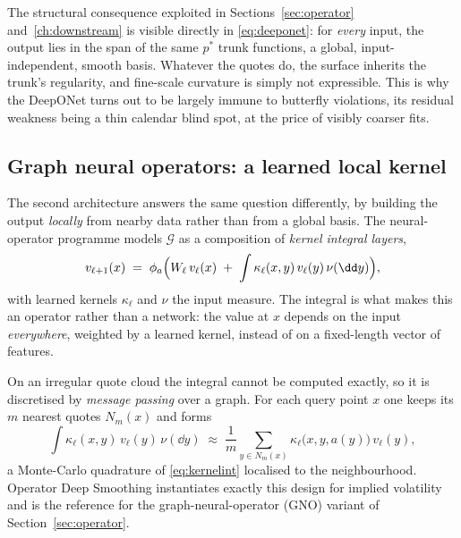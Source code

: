 The structural consequence exploited in Sections~\ref{sec:operator} and~\ref{ch:downstream} is
visible directly in \eqref{eq:deeponet}: for \emph{every} input, the output lies in the span of
the same $p^\ast$ trunk functions, a global, input-independent, smooth basis. Whatever the quotes
do, the surface inherits the trunk's regularity, and fine-scale curvature is simply not
expressible. This is why the DeepONet turns out to be largely immune to butterfly violations,
its residual weakness being a thin calendar blind spot, at the price of visibly coarser fits.

\subsection{Graph neural operators: a learned local kernel}

The second architecture answers the same question differently, by building the output
\emph{locally} from nearby data rather than from a global basis. The neural-operator programme \cite{li2020gno,li2021fno,kovachki2023} models $\mathcal G$ as a
composition of \emph{kernel integral layers},
\begin{equation}\label{eq:kernelint}
v_{\ell+1}(x)\;=\;\phi_a\Bigl(W_\ell\,v_\ell(x)\;+\;\int\kappa_\ell(x,y)\,v_\ell(y)\,
\nu(\dd y)\Bigr),
\end{equation}
with learned kernels $\kappa_\ell$ and $\nu$ the input measure. The integral is what makes this
an operator rather than a network: the value at $x$ depends on the input \emph{everywhere},
weighted by a learned kernel, instead of on a fixed-length vector of features.

On an irregular quote cloud the integral cannot be computed exactly, so it is discretised by
\emph{message passing} over a graph. For each query point $x$ one keeps its $m$ nearest quotes
$N_m(x)$ and forms
\begin{equation}\label{eq:gno}
\int\kappa_\ell(x,y)\,v_\ell(y)\,\nu(\dd y)\;\approx\;
\frac{1}{m}\sum_{y\in N_m(x)}\kappa_\ell\bigl(x,y,a(y)\bigr)\,v_\ell(y),
\end{equation}
a Monte-Carlo quadrature of \eqref{eq:kernelint} localised to the neighbourhood. Operator Deep
Smoothing \cite{wiedemann2025} instantiates exactly this design for implied volatility and is
the reference for the graph-neural-operator (GNO) variant of Section~\ref{sec:operator}.

